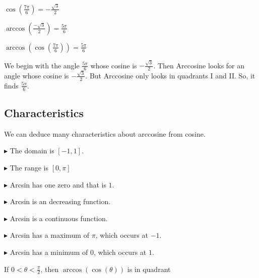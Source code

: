 \documentclass{ximera}
\begin{document}
\begin{example}



$\cos\left(\frac{7\pi}{6}\right) = -\frac{\sqrt{3}}{2}$

$\arccos\left(\frac{-\sqrt{3}}{2}\right) = \frac{5\pi}{6}$


$\arccos\left(\cos\left(\frac{7\pi}{6}\right)\right) = \frac{5\pi}{6}$




We begin with the angle $\frac{5\pi}{6}$ whose cosine is $-\frac{\sqrt{3}}{2}$.  Then Arccosine looks for an angle whose cosine is $-\frac{\sqrt{3}}{2}$.  But Arccosine only looks in quadrants I and II.  So, it finds $\frac{5\pi}{6}$.


\end{example}











\subsection{\textbf{\textcolor{purple!85!blue}{Characteristics}}} 

We can deduce many characteristics about arccosine from cosine.


$\blacktriangleright$ The domain is  $[-1, 1]$.


$\blacktriangleright$ The range is $[0, \pi]$


$\blacktriangleright$ Arcsin has one zero and that is $1$.


$\blacktriangleright$ Arcsin is an decreasing function.

$\blacktriangleright$ Arcsin is a continuous function.

$\blacktriangleright$ Arcsin has a maximum of $\pi$, which occurs at $-1$.

$\blacktriangleright$ Arcsin has a minimum of $0$, which occurs at $1$.








\begin{question}


If $0 < \theta < \frac{\pi}{2}$, then $\arccos(\cos(\theta))$ is in quadrant

\begin{multipleChoice}
\end{multipleChoice}

\end{question}
\end{document}
